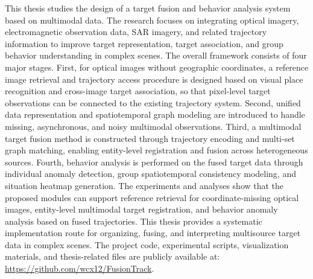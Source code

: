 \begin{abstract}
本文围绕基于多模态数据的目标融合与行为分析系统设计展开研究。针对复杂场景中单一观测手段信息不完整、目标身份难以保持一致以及群体行为理解不足等问题，本文综合利用光学图像、电磁观测数据、合成孔径雷达图像及相关轨迹信息，构建从目标轨迹接入、跨模态目标融合到行为异常分析的完整技术流程，以提高复杂环境下目标表征、目标关联和态势理解的可靠性。
系统框架主要包括四个部分。首先，针对缺少地理坐标的光学图像，引入基于视觉地点识别的参考图像检索方法，并结合后续跨图像目标关联，使图像平面中的目标观测能够接入已有轨迹体系。其次，面向多源观测中存在的缺失、异步和噪声问题，建立统一的数据表示与时空图建模方式，为后续跨模态处理提供结构化输入。再次，构建基于轨迹编码和多集合图匹配的多模态目标融合方法，通过实体级配准实现不同观测源之间的目标对应和信息融合。最后，在融合后的目标轨迹基础上进行个体行为和群体行为分析，利用异常检测、群体时空一致性建模和态势热力图生成等方法输出可解释的行为分析结果。
实验与分析表明，所设计的各功能模块能够分别支持无坐标光学图像的参考检索、多模态目标实体配准以及基于融合轨迹的行为异常分析。本文的研究为复杂场景下多源目标数据的统一组织、可靠融合和高层行为理解提供了一种系统化实现思路。
项目代码、实验脚本、可视化材料和论文相关文件已公开于：\url{https://github.com/wcx12/FusionTrack}。
\end{abstract}

\begin{abstractEn}
This thesis studies the design of a target fusion and behavior analysis system based on multimodal data. The research focuses on integrating optical imagery, electromagnetic observation data, SAR imagery, and related trajectory information to improve target representation, target association, and group behavior understanding in complex scenes.
The overall framework consists of four major stages. First, for optical images without geographic coordinates, a reference image retrieval and trajectory access procedure is designed based on visual place recognition and cross-image target association, so that pixel-level target observations can be connected to the existing trajectory system. Second, unified data representation and spatiotemporal graph modeling are introduced to handle missing, asynchronous, and noisy multimodal observations. Third, a multimodal target fusion method is constructed through trajectory encoding and multi-set graph matching, enabling entity-level registration and fusion across heterogeneous sources. Fourth, behavior analysis is performed on the fused target data through individual anomaly detection, group spatiotemporal consistency modeling, and situation heatmap generation.
The experiments and analyses show that the proposed modules can support reference retrieval for coordinate-missing optical images, entity-level multimodal target registration, and behavior anomaly analysis based on fused trajectories. This thesis provides a systematic implementation route for organizing, fusing, and interpreting multisource target data in complex scenes.
The project code, experimental scripts, visualization materials, and thesis-related files are publicly available at: \url{https://github.com/wcx12/FusionTrack}.
\end{abstractEn}
